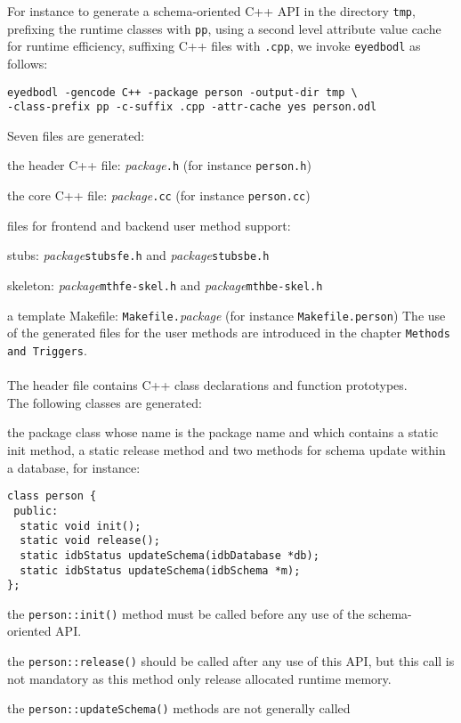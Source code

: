 For instance to generate a schema-oriented C++ API in the directory
\texttt{tmp}, prefixing the runtime classes with \texttt{pp},
using a second level attribute value cache for runtime efficiency, suffixing
C++ files with \texttt{.cpp}, we invoke \texttt{eyedbodl} as follows:
\begin{verbatim}
eyedbodl -gencode C++ -package person -output-dir tmp \
-class-prefix pp -c-suffix .cpp -attr-cache yes person.odl
\end{verbatim}
Seven files are generated:
\be
\item the header C++ file: \emph{package}\texttt{.h}
 (for instance \texttt{person.h})
\item the core C++ file: \emph{package}\texttt{.cc}
(for instance \texttt{person.cc})
\item files for frontend and backend user method support:
\be
\item stubs: \emph{package}\texttt{stubsfe.h}
and  \emph{package}\texttt{stubsbe.h}
\item skeleton: \emph{package}\texttt{mthfe-skel.h}
and  \emph{package}\texttt{mthbe-skel.h}
\item a template Makefile:
\texttt{Makefile.}\emph{package}
\ee
(for instance \texttt{Makefile.person})
\ee
The use of the generated files for the user methods are introduced in the
chapter \texttt{Methods and Triggers}.
\\
\\
The header file contains C++ class declarations and function prototypes.
\\
The following classes are generated:
\be
\item the package class whose name is the package name and which contains
a static init method, a static release method and two methods for
schema update within a database, for instance:
\verbsize
\begin{verbatim}
class person {
 public:
  static void init();
  static void release();
  static idbStatus updateSchema(idbDatabase *db);
  static idbStatus updateSchema(idbSchema *m);
};
\end{verbatim}
\normalsize
\be
\item the \texttt{person::init()} method must be called before any use of
the schema-oriented API.
\item the \texttt{person::release()} should be called after any use
of this API, but this call is not mandatory as this method only
release allocated runtime memory.
\item the \texttt{person::updateSchema()} methods are not generally called
